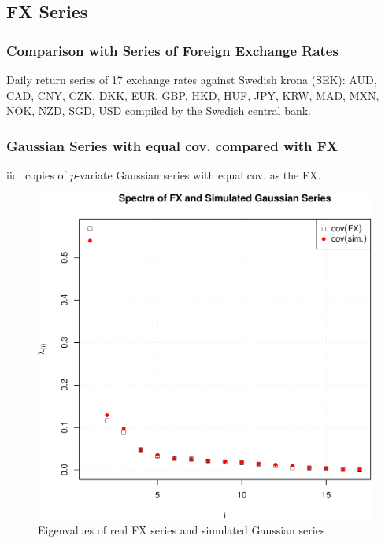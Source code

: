 \documentclass{beamer}
\begin{document}
\subsection{FX Series}
\begin{frame}
  \frametitle{Comparison with Series of Foreign Exchange Rates}
  Daily return series of 17 exchange rates against Swedish krona (SEK):
  AUD,
  CAD,
  CNY,
  CZK,
  DKK,
  EUR,
  GBP,
  HKD,
  HUF,
  JPY,
  KRW,
  MAD,
  MXN,
  NOK,
  NZD,
  SGD,
  USD
  compiled by the Swedish central bank.
\end{frame}

\begin{frame}
  \frametitle{Gaussian Series with equal cov. compared with FX}
  \begin{minipage}{0.5\linewidth}
    iid. copies of $p$-variate Gaussian series with equal cov. as the FX.
  \end{minipage}\hfill
  \begin{minipage}{0.5\linewidth}
  \begin{figure}[htb!]
    \centering
    \includegraphics[width=1.0\linewidth]{Gaussian_eigenvalues.pdf}
    \caption{\scriptsize Eigenvalues of real FX series and simulated Gaussian series}
  \end{figure}
  \end{minipage}
\end{frame}
\end{document}
